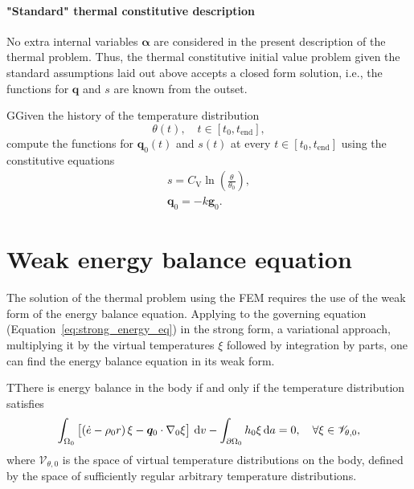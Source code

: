 \paragraph{"Standard" thermal constitutive description}
No extra internal variables \(\bm \alpha\) are considered in the present description of the thermal problem.
Thus, the thermal constitutive initial value problem given the standard assumptions laid out above accepts a closed form solution, i.e., the functions for \(\bm q\) and \(s\) are known from the outset.

\begin{problem}
GGiven the history of the temperature distribution
\[\theta(t),\quad t\in[t_0, t_\text{end}],\]
compute the functions for $\bm q_0(t)$ and \(s(t)\) at every $t\in [t_0, t_\text{end}]$ using the constitutive equations
\begin{gather}
    s =C_{\mathrm{V}} \ln \left(\frac{\theta}{\theta_{0}}\right),\\
    \bm q_0 = -k\bm g_0.
\end{gather}
\end{problem}

\section{Weak energy balance equation}

The solution of the thermal problem using the FEM requires the use of the weak form of the energy balance equation.
Applying to the governing equation (Equation~\eqref{eq:strong_energy_eq}) in the strong form, a variational approach, multiplying it by the virtual temperatures \(\xi\) followed by integration by parts, one can find the energy balance equation in its weak form.
\begin{problem}
TThere is energy balance in the body if and only if the temperature distribution satisfies
    \begin{equation}
        \int_{\Omega_0}   \left[\left(\dot e - \rho_0 r\right) \xi - \bm q_0\cdot \nabla_0 \xi\right]\,\mathrm{d} v - \int_{\partial\Omega_0} h_0 \xi\,\mathrm{d} a = 0,\quad \forall \xi \in \mathscr{V}_{\theta,0},
    \end{equation}
 where $\mathscr{V}_{\theta,0}$ is the space of virtual temperature distributions on the body, defined by the space of sufficiently regular arbitrary temperature distributions.
 \end{problem}

